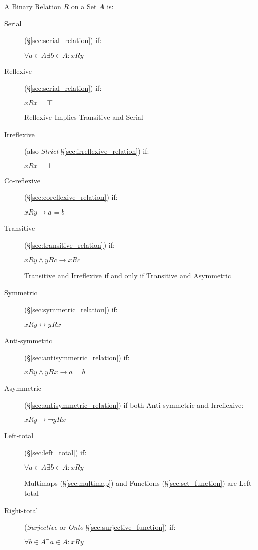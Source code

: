 A Binary Relation $R$ on a Set $A$ is:
\begin{description}
\item[Serial](\S\ref{sec:serial_relation}) if:

  $ \forall a \in A \exists b \in A : xRy $

\item[Reflexive](\S\ref{sec:serial_relation}) if:

  $ xRx = \top $

  Reflexive Implies Transitive and Serial

\item[Irreflexive] (also \emph{Strict}
  \S\ref{sec:irreflexive_relation}) if:

  $ xRx = \bot $

\item[Co-reflexive](\S\ref{sec:coreflexive_relation}) if:

  $ xRy \rightarrow a = b $

\item[Transitive](\S\ref{sec:transitive_relation}) if:

  $ xRy \wedge yRc \rightarrow xRc $

  Transitive and Irreflexive if and only if Transitive and Asymmetric

\item[Symmetric](\S\ref{sec:symmetric_relation}) if:

  $ xRy \leftrightarrow yRx $

\item[Anti-symmetric](\S\ref{sec:antisymmetric_relation}) if:

  $ xRy \wedge yRx \rightarrow a = b $

\item[Asymmetric](\S\ref{sec:antisymmetric_relation}) if both
  Anti-symmetric and Irreflexive:

  $ xRy \rightarrow \neg yRx $

\item[Left-total] (\S\ref{sec:left_total}) if:

  $ \forall a \in A \exists b \in A : xRy $

  Multimaps (\S\ref{sec:multimap}) and Functions
  (\S\ref{sec:set_function}) are Left-total

\item[Right-total] (\emph{Surjective} or \emph{Onto}
  \S\ref{sec:surjective_function}) if:

  $ \forall b \in A \exists a \in A : xRy $


\end{description}

